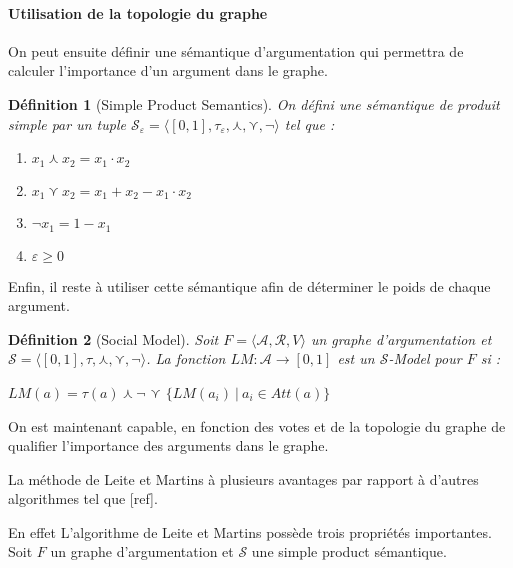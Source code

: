 \documentclass[11pt]{article}
\theoremstyle{defi}
\newtheorem{definition}{Définition}[section]
\theoremstyle{not}
\theoremstyle{prob}
\begin{document}
      \paragraph{Utilisation de la topologie du graphe}

        On peut ensuite définir une sémantique d'argumentation qui permettra de calculer l'importance d'un argument dans le graphe.

        \begin{definition}[Simple Product Semantics]
          On défini une sémantique de produit simple par un tuple $\mathcal{S}_\varepsilon = \langle [0, 1], \tau_\varepsilon, \curlywedge, \curlyvee, \neg  \rangle$ tel que :
          \begin{enumerate}
            \item $x_1 \curlywedge x_2 = x_1 \cdot x_2$
            \item $x_1 \curlyvee x_2 = x_1 + x_2 - x_1 \cdot x_2$
            \item $\neg x_1 = 1 - x_1$
            \item $\varepsilon \geq 0$
          \end{enumerate}
        \end{definition}


        Enfin, il reste à utiliser cette sémantique afin de déterminer le poids de chaque argument.

        \begin{definition}[Social Model]
          Soit $F= \langle \mathcal{A}, \mathcal{R}, V \rangle$ un graphe d'argumentation et $\mathcal{S} = \langle [0, 1], \tau, \curlywedge, \curlyvee, \neg  \rangle$.
        La fonction $LM : \mathcal{A} \rightarrow [0, 1]$ est un $\mathcal{S}$-Model pour $F$ si :

        $LM(a) = \tau(a) \curlywedge \neg$ {\Large $\curlyvee$} $\{LM(a_i)\ |\ a_i \in Att(a)\}$
        \end{definition}

      On est maintenant capable, en fonction des votes et de la topologie du graphe de qualifier l'importance des arguments dans le graphe.

      La méthode de Leite et Martins à plusieurs avantages par rapport à d'autres algorithmes tel que [ref].

      En effet L'algorithme de Leite et Martins possède trois propriétés importantes. Soit $F$ un graphe d'argumentation et $\mathcal{S}$ une simple product sémantique.
\end{document}
